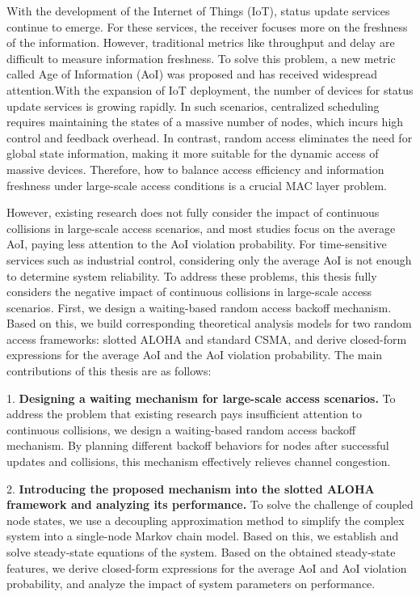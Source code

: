 \begin{abstractEN}
\setlength{\baselineskip}{23pt} %

With the development of the Internet of Things (IoT), status update services continue to emerge. For these services, the receiver focuses more on the freshness of the information. However, traditional metrics like throughput and delay are difficult to measure information freshness. To solve this problem, a new metric called Age of Information (AoI) was proposed and has received widespread attention.With the expansion of IoT deployment, the number of devices for status update services is growing rapidly. In such scenarios, centralized scheduling requires maintaining the states of a massive number of nodes, which incurs high control and feedback overhead. In contrast, random access eliminates the need for global state information, making it more suitable for the dynamic access of massive devices. Therefore, how to balance access efficiency and information freshness under large-scale access conditions is a crucial MAC layer problem.

However, existing research does not fully consider the impact of continuous collisions in large-scale access scenarios, and most studies focus on the average AoI, paying less attention to the AoI violation probability. For time-sensitive services such as industrial control, considering only the average AoI is not enough to determine system reliability. To address these problems, this thesis fully considers the negative impact of continuous collisions in large-scale access scenarios. First, we design a waiting-based random access backoff mechanism. Based on this, we build corresponding theoretical analysis models for two random access frameworks: slotted ALOHA and standard CSMA, and derive closed-form expressions for the average AoI and the AoI violation probability. The main contributions of this thesis are as follows:

1. \textbf{Designing a waiting mechanism for large-scale access scenarios.} To address the problem that existing research pays insufficient attention to continuous collisions, we design a waiting-based random access backoff mechanism. By planning different backoff behaviors for nodes after successful updates and collisions, this mechanism effectively relieves channel congestion.

2. \textbf{Introducing the proposed mechanism into the slotted ALOHA framework and analyzing its performance.} To solve the challenge of coupled node states, we use a decoupling approximation method to simplify the complex system into a single-node Markov chain model. Based on this, we establish and solve steady-state equations of the system. Based on the obtained steady-state features, we derive closed-form expressions for the average AoI and AoI violation probability, and analyze the impact of system parameters on performance.


\end{abstractEN}
